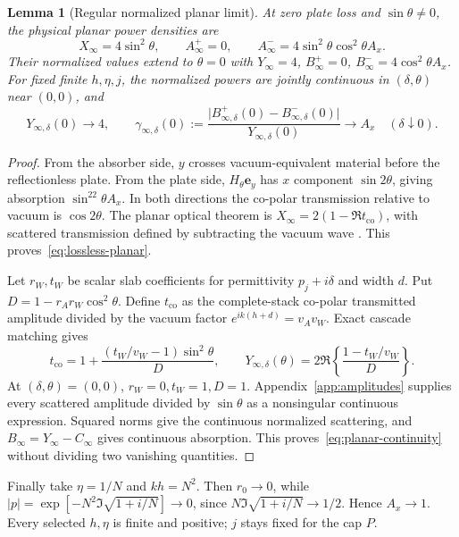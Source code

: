 \documentclass[11pt]{article}
\newtheorem{lemma}[theorem]{Lemma}
\newcommand{\ey}{\mathbf e_y}
\newcommand{\abs}[1]{\lvert #1\rvert}
\begin{document}
\begin{lemma}[Regular normalized planar limit]\label{lem:planar}
At zero plate loss and $\sin\theta\ne0$, the physical planar power densities are
\begin{equation}\label{eq:lossless-planar}
 X_\infty=4\sin^2\theta,\qquad
 A_\infty^+=0,\qquad
 A_\infty^-=4\sin^2\theta\cos^2\theta A_x.
\end{equation}
Their normalized values extend to $\theta=0$ with $Y_\infty=4$, $B_\infty^+=0$, $B_\infty^-=4\cos^2\theta A_x$. For fixed finite $h,\eta,j$, the normalized powers are jointly continuous in $(\delta,\theta)$ near $(0,0)$, and
\begin{equation}\label{eq:planar-continuity}
 Y_{\infty,\delta}(0)\to4,\qquad
 \gamma_{\infty,\delta}(0):=
 \frac{\abs{B_{\infty,\delta}^+(0)-B_{\infty,\delta}^-(0)}}{Y_{\infty,\delta}(0)}\to A_x
 \quad(\delta\downarrow0).
\end{equation}
\end{lemma}
\begin{proof}
From the absorber side, $y$ crosses vacuum-equivalent material before the reflectionless plate. From the plate side, $H_\theta\ey$ has $x$ component $\sin2\theta$, giving absorption $\sin^22\theta A_x$. In both directions the co-polar transmission relative to vacuum is $\cos2\theta$. The planar optical theorem is $X_\infty=2(1-\Re t_{\mathrm{co}})$, with scattered transmission defined by subtracting the vacuum wave \citep{Gustafsson2012}. This proves~\eqref{eq:lossless-planar}.

Let $r_W,t_W$ be scalar slab coefficients for permittivity $p_j+i\delta$ and width $d$. Put $D=1-r_Ar_W\cos^2\theta$. Define $t_{\mathrm{co}}$ as the complete-stack co-polar transmitted amplitude divided by the vacuum factor $e^{ik(h+d)}=v_Av_W$. Exact cascade matching gives
\begin{equation}\label{eq:planar-formula}
 t_{\mathrm{co}}=1+\frac{(t_W/v_W-1)\sin^2\theta}{D},\qquad
 Y_{\infty,\delta}(\theta)=2\Re\left\{\frac{1-t_W/v_W}{D}\right\}.
\end{equation}
At $(\delta,\theta)=(0,0)$, $r_W=0,t_W=1,D=1$. Appendix~\ref{app:amplitudes} supplies every scattered amplitude divided by $\sin\theta$ as a nonsingular continuous expression. Squared norms give the continuous normalized scattering, and $B_\infty=Y_\infty-C_\infty$ gives continuous absorption. This proves~\eqref{eq:planar-continuity} without dividing two vanishing quantities.
\end{proof}
Finally take $\eta=1/N$ and $kh=N^2$. Then $r_0\to0$, while $\abs p=\exp[-N^2\Im\sqrt{1+i/N}]\to0$, since $N\Im\sqrt{1+i/N}\to1/2$. Hence $A_x\to1$. Every selected $h,\eta$ is finite and positive; $j$ stays fixed for the cap $P$.
\end{document}
